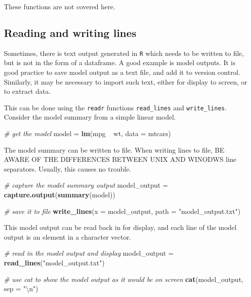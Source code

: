 \documentclass[]{book}
\newenvironment{Shaded}{}{}
\newcommand{\CharTok}[1]{\textcolor[rgb]{0.25,0.44,0.63}{#1}}
\newcommand{\CommentTok}[1]{\textcolor[rgb]{0.38,0.63,0.69}{\textit{#1}}}
\newcommand{\DataTypeTok}[1]{\textcolor[rgb]{0.56,0.13,0.00}{#1}}
\newcommand{\KeywordTok}[1]{\textcolor[rgb]{0.00,0.44,0.13}{\textbf{#1}}}
\newcommand{\NormalTok}[1]{#1}
\newcommand{\OperatorTok}[1]{\textcolor[rgb]{0.40,0.40,0.40}{#1}}
\newcommand{\StringTok}[1]{\textcolor[rgb]{0.25,0.44,0.63}{#1}}
\begin{document}
These functions are not covered here.

\hypertarget{reading-and-writing-lines}{%
\subsection{Reading and writing lines}\label{reading-and-writing-lines}}

Sometimes, there is text output generated in \texttt{R} which needs to be written to file, but is not in the form of a dataframe. A good example is model outputs. It is good practice to save model output as a text file, and add it to version control.
Similarly, it may be necessary to import such text, either for display to screen, or to extract data.

This can be done using the \texttt{readr} functions \texttt{read\_lines} and \texttt{write\_lines}. Consider the model summary from a simple linear model.

\begin{Shaded}
\begin{Highlighting}[]
\CommentTok{# get the model}
\NormalTok{model =}\StringTok{ }\KeywordTok{lm}\NormalTok{(mpg }\OperatorTok{~}\StringTok{ }\NormalTok{wt, }\DataTypeTok{data =}\NormalTok{ mtcars)}
\end{Highlighting}
\end{Shaded}

The model summary can be written to file. When writing lines to file, BE AWARE OF THE DIFFERENCES BETWEEN UNIX AND WINODWS line separators. Usually, this causes no trouble.

\begin{Shaded}
\begin{Highlighting}[]
\CommentTok{# capture the model summary output}
\NormalTok{model_output =}\StringTok{ }\KeywordTok{capture.output}\NormalTok{(}\KeywordTok{summary}\NormalTok{(model))}

\CommentTok{# save it to file}
\KeywordTok{write_lines}\NormalTok{(}\DataTypeTok{x =}\NormalTok{ model_output,}
  \DataTypeTok{path =} \StringTok{"model_output.txt"}\NormalTok{)}
\end{Highlighting}
\end{Shaded}

This model output can be read back in for display, and each line of the model output is an element in a character vector.

\begin{Shaded}
\begin{Highlighting}[]
\CommentTok{# read in the model output and display}
\NormalTok{model_output =}\StringTok{ }\KeywordTok{read_lines}\NormalTok{(}\StringTok{"model_output.txt"}\NormalTok{)}

\CommentTok{# use cat to show the model output as it would be on screen}
\KeywordTok{cat}\NormalTok{(model_output, }\DataTypeTok{sep =} \StringTok{"}\CharTok{\textbackslash{}n}\StringTok{"}\NormalTok{)}
\end{Highlighting}
\end{Shaded}
\end{document}
